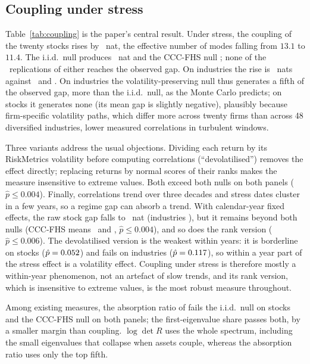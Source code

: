 \documentclass[12pt]{article}
\theoremstyle{definition}
\theoremstyle{remark}
\begin{document}
\begin{doublespace}
\subsection{Coupling under stress}

Table~\ref{tab:coupling} is the paper's central result. Under stress, the
coupling of the twenty stocks rises by \qCplSpObs~nat, the effective number of
modes falling from $13.1$ to $11.4$. The i.i.d.\ null produces \qCplSpIid~nat and
the CCC-FHS null \gnSpRawNull; none of the \nRep\ replications of either reaches
the observed gap. On industries the rise is \qCplFfObs~nats against \qCplFfIid\ and
\gnFfRawNull. On industries the volatility-preserving null thus generates a
fifth of the observed gap, more than the i.i.d.\ null, as the Monte Carlo
predicts; on stocks it generates none (its mean gap is slightly negative),
plausibly because firm-specific volatility paths, which differ more across
twenty firms than across 48 diversified industries, lower measured
correlations in turbulent windows.

Three variants address the usual objections. Dividing each return by its
RiskMetrics volatility before computing correlations
(``devolatilised'') removes the \citet{forbes2002} effect directly; replacing
returns by normal scores of their ranks makes the measure insensitive to
extreme values. Both exceed both nulls on both panels ($\hat p\le0.004$).
Finally, correlations trend over three decades and stress dates cluster in a
few years, so a regime gap can absorb a trend. With calendar-year fixed
effects, the raw stock gap falls to \gnSpFeObs~nat (industries \gnFfFeObs),
but it remains beyond both nulls (CCC-FHS means \gnSpFeNull\ and
\gnFfFeNull, $\hat p\le0.004$), and so does the rank version ($\hat p\le0.006$). The
devolatilised version is the weakest within years: it is borderline on stocks
($\hat p=0.052$) and fails on industries ($\hat p=0.117$),
so within a year part of the stress effect is a volatility effect. Coupling
under stress is therefore mostly a within-year phenomenon, not an artefact of
slow trends, and its rank version, which is insensitive to extreme values,
is the most robust measure throughout.

Among existing measures, the absorption ratio of \citet{kritzman2011} fails
the i.i.d.\ null on stocks and the CCC-FHS null on both panels;
the first-eigenvalue share passes both, by a smaller margin than coupling. $\log\det R$ uses the whole spectrum,
including the small eigenvalues that collapse when assets couple, whereas the
absorption ratio uses only the top fifth.


\end{doublespace}
\end{document}
